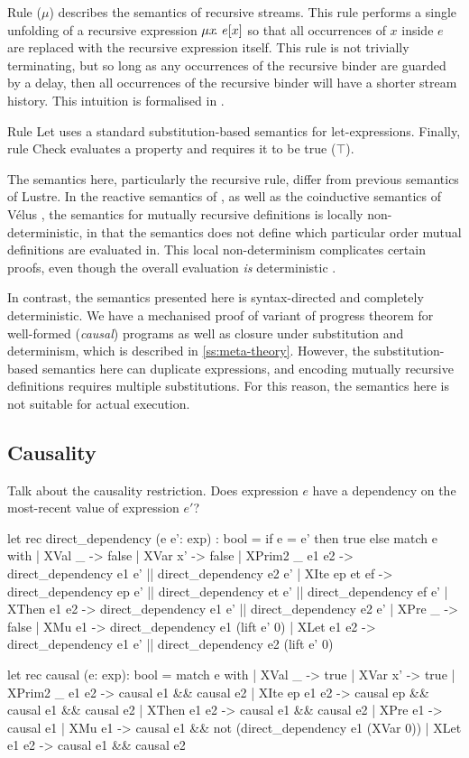 \documentclass[sigplan,screen]{acmart}
\begin{document}
Rule ($\mu{}$) describes the semantics of recursive streams.
This rule performs a single unfolding of a recursive expression $\mu{} x \!.~e[x]$ so that all occurrences of $x$ inside $e$ are replaced with the recursive expression itself.
This rule is not trivially terminating, but so long as any occurrences of the recursive binder are guarded by a delay, then all occurrences of the recursive binder will have a shorter stream history.
This intuition is formalised in \REF{}.

Rule Let uses a standard substitution-based semantics for let-expressions.
Finally, rule Check evaluates a property and requires it to be true ($\top$).

The semantics here, particularly the recursive rule, differ from previous semantics of Lustre.
In the reactive semantics of \cite{caspi1995functional}, as well as the coinductive semantics of Vélus , the semantics for mutually recursive definitions is locally non-deterministic, in that the semantics does not define which particular order mutual definitions are evaluated in.
This local non-determinism complicates certain proofs, even though the overall evaluation \emph{is} deterministic .

In contrast, the semantics presented here is syntax-directed and completely deterministic.
We have a mechanised proof of variant of progress theorem for well-formed (\emph{causal}) programs as well as closure under substitution and determinism, which is described in \autoref{ss:meta-theory}.
However, the substitution-based semantics here can duplicate expressions, and encoding mutually recursive definitions requires multiple substitutions.
For this reason, the semantics here is not suitable for actual execution.

\subsection{Causality}
\label{ss:causality}

Talk about the causality restriction.
Does expression $e$ have a dependency on the most-recent value of expression $e'$?

\begin{code}
let rec direct_dependency (e e': exp) : bool =
  if e = e' then true
  else
  match e with
  | XVal _ -> false
  | XVar x' -> false
  | XPrim2 _ e1 e2 -> direct_dependency e1 e' || direct_dependency e2 e'
  | XIte ep et ef -> direct_dependency ep e' || direct_dependency et e' || direct_dependency ef e'
  | XThen e1 e2 -> direct_dependency e1 e' || direct_dependency e2 e'
  | XPre _ -> false
  | XMu e1 -> direct_dependency e1 (lift e' 0)
  | XLet e1 e2 -> direct_dependency e1 e' || direct_dependency e2 (lift e' 0)

let rec causal (e: exp): bool =
  match e with
  | XVal _ -> true
  | XVar x' -> true
  | XPrim2 _ e1 e2 -> causal e1 && causal e2
  | XIte ep e1 e2 -> causal ep && causal e1 && causal e2
  | XThen e1 e2 -> causal e1 && causal e2
  | XPre e1 -> causal e1
  | XMu e1 -> causal e1 && not (direct_dependency e1 (XVar 0))
  | XLet e1 e2 -> causal e1 && causal e2
\end{code}
\end{document}
